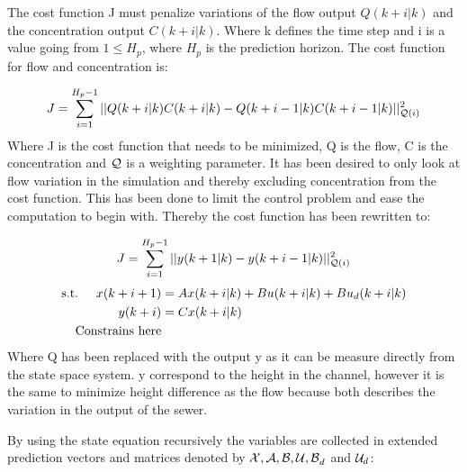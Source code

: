 The cost function J must penalize variations of the flow output $Q(k+i|k)$ and the concentration output $C(k+i|k)$. Where k defines the time step and i is a value going from $1\leq H_p$, where $H_p$ is the prediction horizon. The cost function for flow and concentration is:

\begin{equation}
	 J = \sum_{i=1}^{H_p-1} || Q(k+i|k)C(k+i|k)-Q(k+i-1|k)C(k+i-1|k)||_{\CMcal{Q}(i)}^2
\end{equation}
Where J is the cost function that needs to be minimized, Q is the flow, C is the concentration and $\CMcal{Q}$ is a weighting parameter. It has been desired to only look at flow variation in the simulation and thereby excluding concentration from the cost function. This has been done to limit the control problem and ease the computation to begin with. Thereby the cost function has been rewritten to: 

\begin{equation}
	 J = \sum_{i=1}^{H_p-1} || y(k+1|k)-y(k+i-1|k)||_{\CMcal{Q}(i)}^2
\end{equation}
\begin{equation}
	\begin{aligned}
	\text{s.t.} \hspace{5mm}  x(k+i+1) &= Ax(k+i|k)+Bu(k+i|k)+Bu_d(k+i|k) \\
						      y(k+i)&= Cx(k+i|k) \\
						      \text{Constrains here}
	\end{aligned}
\end{equation}
Where Q has been replaced with the output y as it can be measure directly from the state space system. y correspond to the height in the channel, however it is the same to minimize height difference as the flow because both describes the variation in the output of the sewer. 


By using the state equation recursively the variables are collected in extended prediction vectors and matrices denoted by $\CMcal{X,A,B,U,B}_d$ and $\CMcal{U}_d$:

